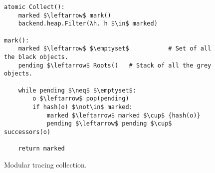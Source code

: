 \begin{figure}[!ht]
  \caption{Modular tracing collection.}
  \label{alg:modular-tracing}

  \vspace{-.5em}
  \centering
  \begin{lstlisting}
atomic Collect():
    marked $\leftarrow$ mark()
    backend.heap.Filter(λh. h $\in$ marked)

mark():
    marked $\leftarrow$ $\emptyset$           # Set of all the black objects.
    pending $\leftarrow$ Roots()   # Stack of all the grey objects.

    while pending $\neq$ $\emptyset$:
        o $\leftarrow$ pop(pending)
        if hash(o) $\not\in$ marked:
            marked $\leftarrow$ marked $\cup$ {hash(o)}
            pending $\leftarrow$ pending $\cup$ successors(o)

    return marked
\end{lstlisting}
\end{figure}
